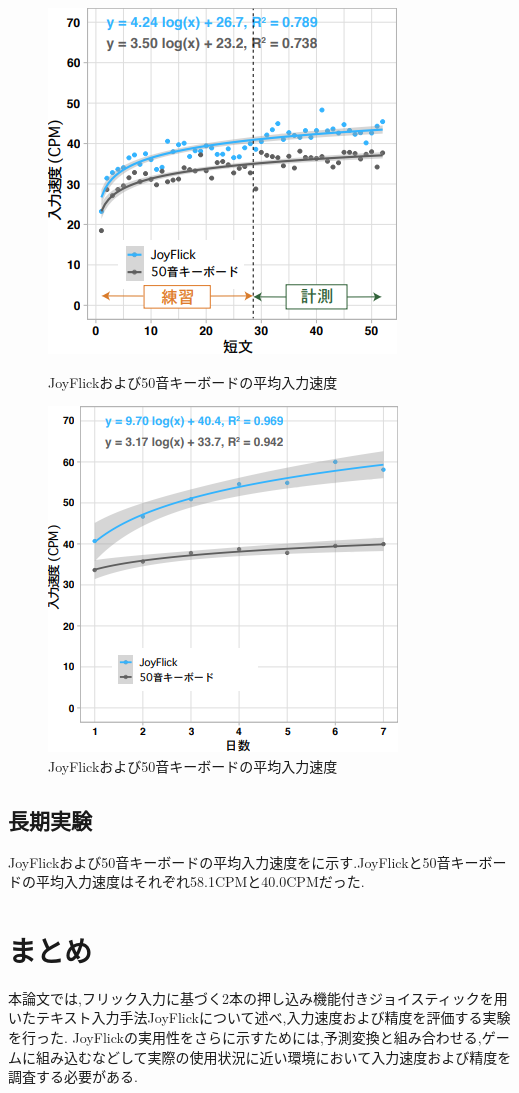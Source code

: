 \documentclass[uplatex]{jsarticle}
\begin{document}
\begin{figure}[tb]
  \centering
  \includegraphics[width=0.7\linewidth]{fig/result_joy50.png}
  \caption{JoyFlickおよび50音キーボードの平均入力速度}
  \label{fig:res_joy50}
  \includegraphics[width=0.7\linewidth]{fig/result_long.png}
  \caption{JoyFlickおよび50音キーボードの平均入力速度}
  \label{fig:res_long}
\end{figure}

\subsection{長期実験}
JoyFlickおよび50音キーボードの平均入力速度をに示す.JoyFlickと50音キーボードの平均入力速度はそれぞれ58.1CPMと40.0CPMだった.

\section{まとめ}
本論文では,フリック入力に基づく2本の押し込み機能付きジョイスティックを用いたテキスト入力手法JoyFlickについて述べ,入力速度および精度を評価する実験を行った.
JoyFlickの実用性をさらに示すためには,予測変換と組み合わせる,ゲームに組み込むなどして実際の使用状況に近い環境において入力速度および精度を調査する必要がある.


 
\end{document}
